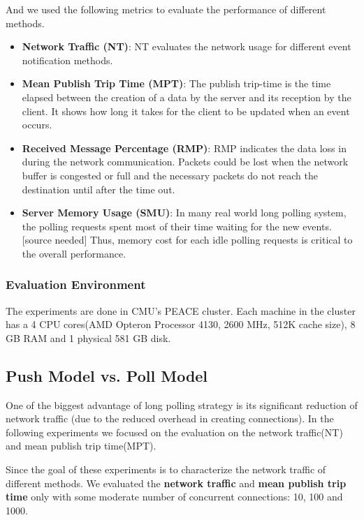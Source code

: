 And we used the following metrics to evaluate the performance of different
methods.
\begin{itemize}
    \item {\bf Network Traffic (NT)}: NT evaluates the network usage for
        different event notification methods.
    \item {\bf Mean Publish Trip Time (MPT)}: The publish trip-time is 
        the time elapsed between the creation of a data by the server and 
        its reception by the client. It shows how long it takes for the 
        client to be updated when an event occurs.
    \item {\bf Received Message Percentage (RMP)}: RMP indicates the data 
        loss in during the network communication. Packets could be lost
		when the network buffer is congested or full and the necessary packets
		do not reach the destination until after the time out.
    \item {\bf Server Memory Usage (SMU)}: In many real world long polling 
        system, the polling requests spent most of their time waiting for 
        the new events.[source needed] Thus, memory cost for each idle 
        polling requests is critical to the overall performance.
\end{itemize}

\subsubsection{Evaluation Environment \\}
The experiments are done in CMU's PEACE cluster. Each machine in the cluster 
has a 4 CPU cores(AMD Opteron Processor 4130, 2600 MHz, 512K cache size),
8 GB RAM and 1 physical 581 GB disk.

\subsection{Push Model vs. Poll Model\\}

One of the biggest advantage of long polling strategy is its significant 
reduction of network traffic (due to the reduced overhead in creating connections).
In the following experiments we focused on the evaluation on the network 
traffic(NT) and mean publish trip time(MPT).

Since the goal of these experiments is to characterize the network traffic 
of different methods. We evaluated the {\bf network traffic} and {\bf mean 
publish trip time} only with some moderate number of concurrent 
connections: 10, 100 and 1000. 

